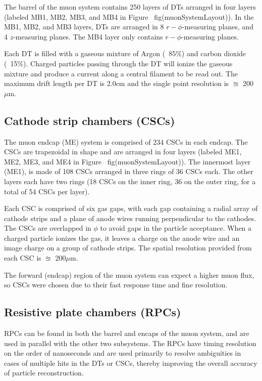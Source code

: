 The barrel of the muon system contains 250 layers of DTs arranged in four layers (labeled MB1, MB2, MB3, and MB4 in Figure ~fig(muonSystemLayout)). In the MB1, MB2, and MB3 layers, DTs are arranged in 8 $r-\phi$-measuring planes, and 4 $z$-measuring planes. The MB4 layer only contains $r-\phi$-measuring planes.

Each DT is filled with a gaseous mixture of Argon (~85\%) and carbon dioxide (~15\%). Charged particles passing through the DT will ionize the gaseous mixture and produce a current along a central filament to be read out. The maximum drift length per DT is 2.0cm and the single point resolution is $\approxeq$ 200 $\mu$m.

\subsection{Cathode strip chambers (CSCs)}

The muon endcap (ME) system is comprised of 234 CSCs in each endcap. The CSCs are trapezoidal in shape and are arranged in four layers  (labeled ME1, ME2, ME3, and ME4 in Figure ~fig(muonSystemLayout)). The innermost layer (ME1), is made of 108 CSCs arranged in three rings of 36 CSCs each. The other layers each have two rings (18 CSCs on the inner ring, 36 on the outer ring, for a total of 54 CSCs per layer).

Each CSC is comprised of six gas gaps, with each gap containing a radial array of cathode strips and a plane of anode wires running perpendicular to the cathodes. The CSCs are overlapped in $\phi$ to avoid gaps in the particle acceptance. When a charged particle ionizes the gas, it leaves a charge on the anode wire and an image charge on a group of cathode strips. The spatial resolution provided from each CSC is $\approxeq$ 200$\mu$m.

The forward (endcap) region of the muon system can expect a higher muon flux, so CSCs were chosen due to their fast response time and fine resolution.

\subsection{Resistive plate chambers (RPCs)}

RPCs can be found in both the barrel and encaps of the muon system, and are used in parallel with the other two subsystems. The RPCs have timing resolution on the order of nanoseconds and are used primarily to resolve ambiguities in cases of multiple hits in the DTs or CSCs, thereby improving the overall accuracy of particle reconstruction.

